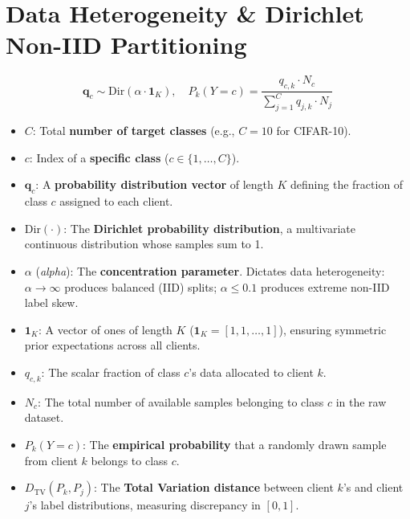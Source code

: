 \documentclass[11pt,a4paper,titlepage]{report}
\begin{document}
\section{Data Heterogeneity \& Dirichlet Non-IID Partitioning}
\begin{equation}
    \mathbf{q}_c \sim \text{Dir}(\alpha \cdot \mathbf{1}_K), \quad P_k(Y = c) = \frac{q_{c, k} \cdot N_c}{\sum_{j=1}^C q_{j, k} \cdot N_j}
\end{equation}
\begin{itemize}[leftmargin=*]
    \item $C$: Total \textbf{number of target classes} (e.g., $C=10$ for CIFAR-10).
    \item $c$: Index of a \textbf{specific class} ($c \in \{1, \dots, C\}$).
    \item $\mathbf{q}_c$: A \textbf{probability distribution vector} of length $K$ defining the fraction of class $c$ assigned to each client.
    \item $\text{Dir}(\cdot)$: The \textbf{Dirichlet probability distribution}, a multivariate continuous distribution whose samples sum to 1.
    \item $\alpha$ (\textit{alpha}): The \textbf{concentration parameter}. Dictates data heterogeneity: $\alpha \to \infty$ produces balanced (IID) splits; $\alpha \le 0.1$ produces extreme non-IID label skew.
    \item $\mathbf{1}_K$: A vector of ones of length $K$ ($\mathbf{1}_K = [1, 1, \dots, 1]$), ensuring symmetric prior expectations across all clients.
    \item $q_{c, k}$: The scalar fraction of class $c$'s data allocated to client $k$.
    \item $N_c$: The total number of available samples belonging to class $c$ in the raw dataset.
    \item $P_k(Y = c)$: The \textbf{empirical probability} that a randomly drawn sample from client $k$ belongs to class $c$.
    \item $D_{\text{TV}}(P_k, P_j)$: The \textbf{Total Variation distance} between client $k$'s and client $j$'s label distributions, measuring discrepancy in $[0, 1]$.
\end{itemize}
\end{document}
